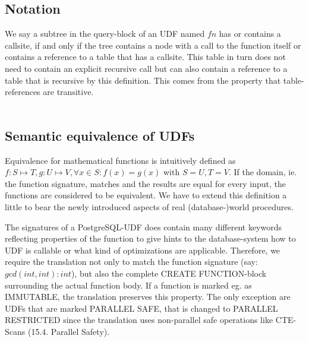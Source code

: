 

\subsection{Notation}
We say a subtree in the query-block of an UDF named $fn$ has or contains a callsite, if and only if the tree contains a node with a call to the function itself or contains a reference to a table that has a callsite. This table in turn does not need to contain an explicit recursive call but can also contain a reference to a table that is recursive by this definition. This comes from the property that table-references are transitive.
\\\\
\subsection{Semantic equivalence of UDFs}
Equivalence for mathematical functions is intuitively defined as $f: S \mapsto T, g: U \mapsto V, \forall x \in S: f(x) = g(x)$ with $S = U, T = V$. If the domain, ie. the function signature, matches and the results are equal for every input, the functions are considered to be equivalent. We have to extend this definition a little to bear the newly introduced aspects of real (database-)world procedures.

The signatures of a PostgreSQL-UDF does contain many different keywords reflecting properties of the function to give hints to the database-system how to UDF is callable or what kind of optimizations are applicable. Therefore, we require the translation not only to match the function signature (say: $gcd(int, int) : int$), but also the complete CREATE FUNCTION-block surrounding the actual function body. If a function is marked eg. as IMMUTABLE, the translation preserves this property. The only exception are UDFs that are marked PARALLEL SAFE, that is changed to PARALLEL RESTRICTED since the translation uses non-parallel safe operations like CTE-Scans (15.4. Parallel Safety).

